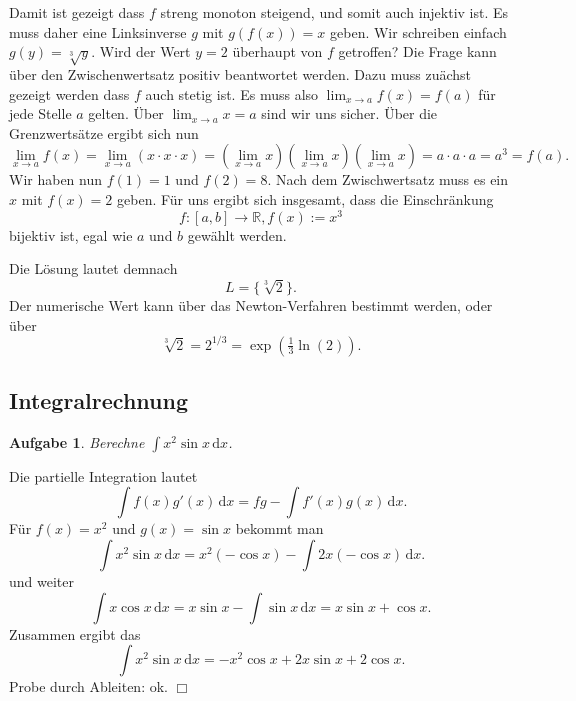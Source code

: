 \documentclass[a4paper,10pt,fleqn,twoside]{scrartcl}
\numberwithin{equation}{section}
\newcommand{\R}{\mathbb R}
\newcommand{\strong}[1]{{\normalfont\sffamily\bfseries #1}}
\theoremstyle{Aufgabe}
\newtheorem{Aufgabe}{\sffamily Aufgabe}[section]
\begin{document}
Damit ist gezeigt dass $f$ streng monoton steigend, und somit auch
injektiv ist. Es muss daher eine Linksinverse $g$ mit $g(f(x))=x$
geben. Wir schreiben einfach $g(y)=\sqrt[3]{y}$.
Wird der Wert $y=2$ überhaupt von $f$ getroffen? Die Frage kann
über den Zwischenwertsatz positiv beantwortet werden. Dazu muss
zuächst gezeigt werden dass $f$ auch stetig ist. Es muss also
$\lim_{x\to a}f(x)=f(a)$ für jede Stelle $a$ gelten. Über
$\lim_{x\to a} x = a$ sind wir uns sicher. Über die Grenzwertsätze ergibt
sich nun
\begin{equation}
\lim_{x\to a} f(x) = \lim_{x\to a} (x\cdot x\cdot x)
= (\lim_{x\to a} x)(\lim_{x\to a} x)(\lim_{x\to a} x)
= a\cdot a\cdot a = a^3 = f(a).
\end{equation}
Wir haben nun $f(1)=1$ und $f(2)=8$. Nach dem Zwischwertsatz
muss es ein $x$ mit $f(x)=2$ geben. Für uns ergibt sich insgesamt, dass
die Einschränkung
\begin{equation}
f\colon [a,b]\to\R, f(x):=x^3
\end{equation}
bijektiv ist, egal wie $a$ und $b$ gewählt werden.

Die Lösung lautet demnach
\begin{equation}
L = \{\sqrt[3]{2}\}.
\end{equation}
Der numerische Wert kann über das Newton-Verfahren bestimmt werden,
oder über
\begin{equation}
\sqrt[3]{2} = 2^{1/3} = \exp(\tfrac{1}{3}\ln(2)).
\end{equation}


\subsection{Integralrechnung}
\begin{Aufgabe}
Berechne $\displaystyle\int x^2\sin x\,\mathrm dx$.
\end{Aufgabe}
\noindent\strong{Lösung.}
Die partielle Integration lautet
\begin{equation}
\int f(x)g'(x)\,\mathrm dx = fg-\int f'(x)g(x)\,\mathrm dx.
\end{equation}
Für $f(x)=x^2$ und $g(x)=\sin x$ bekommt man
\begin{equation}
\int x^2\sin x\,\mathrm dx = x^2(-\cos x) - \int 2x(-\cos x)\,\mathrm dx.
\end{equation}
und weiter
\begin{equation}
\int x\cos x\,\mathrm dx = x\sin x - \int \sin x\,\mathrm dx = x\sin x + \cos x.
\end{equation}
Zusammen ergibt das
\begin{equation}
\int x^2\sin x\,\mathrm dx = -x^2\cos x +2x\sin x+2\cos x.
\end{equation}
Probe durch Ableiten: ok. $\Box$
\end{document}

